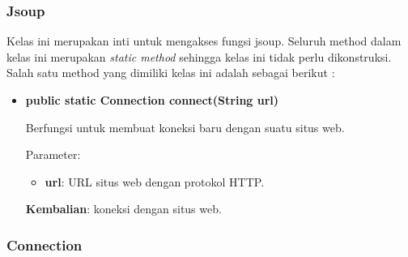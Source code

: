 \subsubsection{Jsoup}
\label{subsubsec:jsoup}
Kelas ini merupakan inti untuk mengakses fungsi jsoup. Seluruh method dalam kelas ini merupakan \textit{static method} sehingga kelas ini tidak perlu dikonstruksi. Salah satu method yang dimiliki kelas ini adalah sebagai berikut :
\begin{itemize}
	\item \textbf{public static Connection connect(String url)}
	
	Berfungsi untuk membuat koneksi baru dengan suatu situs web.
	
	Parameter:
	\begin{itemize}
		\item \textbf{url}: URL situs web dengan protokol HTTP.
	\end{itemize}
	\textbf{Kembalian}: koneksi dengan situs web.
\end{itemize}

\subsubsection{Connection}
\label{subsubsec:connection}

